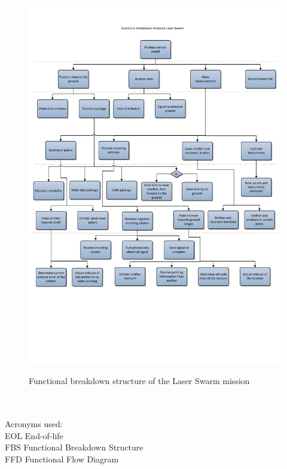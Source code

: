 \begin{figure}
\begin{center}
\includegraphics[trim = 0mm 60mm 0mm 0mm, clip, scale=0.7]{img/pic_FBS.pdf}
\label{pic_FBS}
\caption{Functional breakdown structure of the Laser Swarm mission}
\end{center}
\end{figure}

\\ \\
Acronyms used:\\
EOL End-of-life\\
FBS Functional Breakdown Structure\\
FFD Functional Flow Diagram